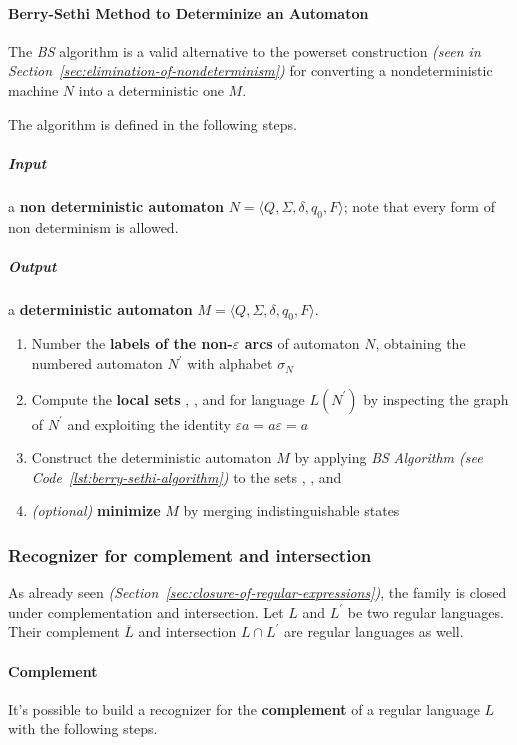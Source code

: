 \documentclass[english]{article}
\begin{document}
\paragraph{Berry-Sethi Method to Determinize an Automaton}
The \textit{BS} algorithm is a valid alternative to the powerset construction \textit{(seen in Section~\ref{sec:elimination-of-nondeterminism})}
for converting a nondeterministic machine \(N\) into a deterministic one \(M\).

The algorithm is defined in the following steps.

\subparagraph*{Input}
a \textbf{non deterministic automaton} \(N = \langle Q, \Sigma, \delta, q_0, F \rangle\);
note that every form of non determinism is allowed.

\subparagraph*{Output}
a \textbf{deterministic automaton} \(M = \langle Q, \Sigma, \delta, q_0, F \rangle\).

\begin{enumerate}
  \item Number the \textbf{labels of the non-\(\varepsilon\) arcs} of automaton \(N\), obtaining the numbered automaton \(N^\prime\) with alphabet \(\sigma_N\)
  \item Compute the \textbf{local sets }\Ini, \Fin, and \Fol for language \(L(N^\prime)\) by inspecting the graph of \(N^\prime\) and exploiting the identity \(\varepsilon a = a \varepsilon = a\)
  \item Construct the deterministic automaton \(M\) by applying \textit{BS} \textit{Algorithm (see Code~\ref{lst:berry-sethi-algorithm})} to the sets \Ini, \Fin, and \Fol
  \item \textit{(optional)} \textbf{minimize} \(M\) by merging indistinguishable states
\end{enumerate}

\subsubsection{Recognizer for complement and intersection}

As already seen \textit{(Section~\ref{sec:closure-of-regular-expressions})}, the \REG family is closed under complementation and intersection.
Let \(L\) and \(L^\prime\) be two regular languages. Their complement \(\overline{L}\) and intersection \(L \cap L^\prime\) are regular languages as well.

\paragraph{Complement}
It's possible to build a recognizer for the \textbf{complement} of a regular language \(L\) with the following steps.
\end{document}
